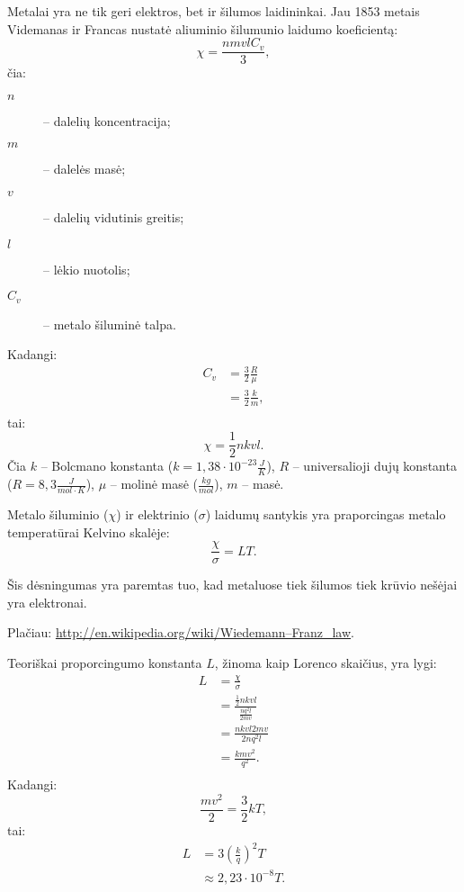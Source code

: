 Metalai yra ne tik geri elektros, bet ir šilumos laidininkai. Jau
1853 metais Videmanas ir Francas nustatė aliuminio šilumunio
laidumo koeficientą:
\begin{equation*}
  \chi = \frac{nmvlC_{v}}{3},
\end{equation*}
čia:
\begin{description}
  \item[$n$] – dalelių koncentracija;
  \item[$m$] – dalelės masė;
  \item[$v$] – dalelių vidutinis greitis;
  \item[$l$] – lėkio nuotolis;
  \item[$C_{v}$] – metalo šiluminė talpa.
\end{description}
Kadangi:
\begin{align*}
  C_{v}
  &= \frac{3}{2}\frac{R}{\mu} \\
  &= \frac{3}{2}\frac{k}{m}, \\
\end{align*}
tai:
\begin{equation*}
  \chi = \frac{1}{2} nkvl.
\end{equation*}
Čia $k$ – Bolcmano konstanta ($k = 1,38\cdot 10^{-23}\frac{J}{K}$),
$R$ – universalioji dujų konstanta ($R = 8,3\frac{J}{mol \cdot K}$),
$\mu$ – molinė masė ($\frac{kg}{mol}$), $m$ – masė.

\begin{defn}
  Metalo šiluminio ($\chi$) ir elektrinio ($\sigma$) laidumų santykis
  yra praporcingas metalo temperatūrai Kelvino skalėje:
  \begin{equation*}
    \frac{\chi}{\sigma} = LT.
  \end{equation*}

  Šis dėsningumas yra paremtas tuo, kad metaluose tiek šilumos tiek
  krūvio nešėjai yra elektronai.

  Plačiau: \url{http://en.wikipedia.org/wiki/Wiedemann–Franz_law}.
\end{defn}

Teoriškai proporcingumo konstanta $L$, žinoma kaip Lorenco skaičius,
yra lygi:
\begin{align*}
  L
  &= \frac{\chi}{\sigma} \\
  &= \frac{\frac{1}{2}nkvl}{\frac{nq^{2}l}{2mv}} \\
  &= \frac{nkvl2mv}{2nq^{2}l} \\
  &= \frac{kmv^{2}}{q^{2}}. \\
\end{align*}
Kadangi:
\begin{equation*}
  \frac{mv^{2}}{2} = \frac{3}{2}kT,
\end{equation*}
tai:
\begin{align*}
  L
  &= 3 \left( \frac{k}{q} \right)^{2}T \\
  &\approx 2,23 \cdot 10^{-8} T.
\end{align*}

